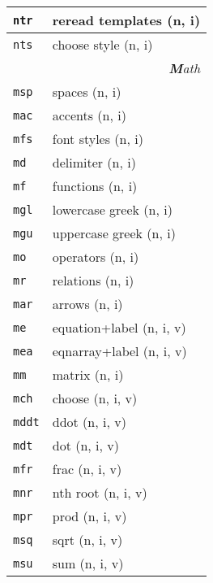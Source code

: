 \documentclass[oneside,10pt,landscape,DIV16]{scrartcl}
\newcommand{\Map}[1] {\textbf{\textasciiacute}\texttt{#1}}
\begin{document}
\begin{multicols}{3}
\begin{center}
\begin{tabular}[]{|p{11mm}|p{62mm}|}
\hline \Map{ntr} & reread templates          \hfill (n, i)   \\
\hline \Map{nts} & choose style              \hfill (n, i)   \\
\hline
\hline
\multicolumn{2}{|r|}{\textsl{\textbf{M}ath}}  \\[1.0ex]
\hline  \Map{msp} & spaces                    \hfill (n, i)\\
\hline  \Map{mac} & accents                   \hfill (n, i)\\
\hline  \Map{mfs} & font styles               \hfill (n, i)\\
\hline  \Map{md}  & delimiter                 \hfill (n, i)\\
\hline  \Map{mf}  & functions                 \hfill (n, i)\\
\hline  \Map{mgl} & lowercase  greek          \hfill (n, i)\\
\hline  \Map{mgu} & uppercase greek           \hfill (n, i)\\
\hline  \Map{mo}  & operators                 \hfill (n, i)\\
\hline  \Map{mr}  & relations                 \hfill (n, i)\\
\hline  \Map{mar} & arrows                    \hfill (n, i)\\
\hline
\hline  \Map{me}  & equation+label            \hfill (n, i, v)\\
\hline  \Map{mea} & eqnarray+label            \hfill (n, i, v)\\
\hline  \Map{mm}  & matrix                    \hfill (n, i)\\
\hline
\hline  \Map{mch} & choose                    \hfill (n, i, v)\\
\hline  \Map{mddt}& ddot                      \hfill (n, i, v)\\
\hline  \Map{mdt} & dot                       \hfill (n, i, v)\\
\hline  \Map{mfr} & frac                      \hfill (n, i, v)\\
\hline  \Map{mnr} & nth root                  \hfill (n, i, v)\\
\hline  \Map{mpr} & prod                      \hfill (n, i, v)\\
\hline  \Map{msq} & sqrt                      \hfill (n, i, v)\\
\hline  \Map{msu} & sum                       \hfill (n, i, v)\\

\end{tabular}
\end{center}
\end{multicols}
\end{document}
